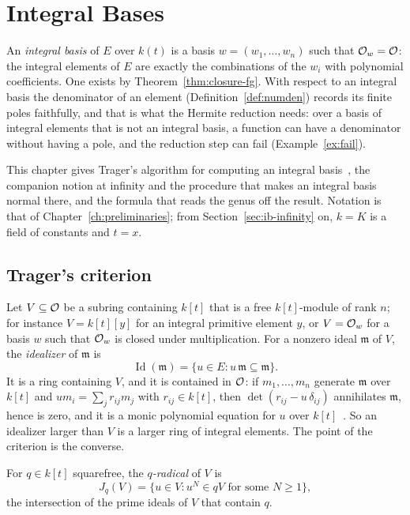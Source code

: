 \chapter{Integral Bases}\label{ch:integral-bases}

An \emph{integral basis} of $E$ over $k(t)$ is a basis $w = (w_1, \dots,
w_n)$ such that $\mathcal{O}_w = \mathcal{O}$: the integral elements of $E$ are exactly the
combinations of the $w_i$ with polynomial coefficients. One exists by
Theorem~\ref{thm:closure-fg}. With respect to an integral basis the
denominator of an element (Definition~\ref{def:numden}) records its finite
poles faithfully, and that is what the Hermite reduction needs: over a basis
of integral elements that is not an integral basis, a function can have a
denominator without having a pole, and the reduction step can fail
(Example~\ref{ex:fail}).

This chapter gives Trager's algorithm for computing an integral
basis~\cite[Chapter~2]{trager1984}, the companion notion at infinity and the
procedure that makes an integral basis normal there, and the formula that
reads the genus off the result. Notation is that of
Chapter~\ref{ch:preliminaries}; from Section~\ref{sec:ib-infinity} on, $k = K$
is a field of constants and $t = x$.

\section{Trager's criterion}\label{sec:ib-criterion}

Let $V \subseteq \mathcal{O}$ be a subring containing $k[t]$ that is a free
$k[t]$-module of rank $n$; for instance $V = k[t][y]$ for an integral
primitive element $y$, or $V = \mathcal{O}_w$ for a basis $w$ such that $\mathcal{O}_w$ is
closed under multiplication. For a nonzero ideal $\mathfrak m$ of $V$, the
\emph{idealizer} of $\mathfrak m$ is
\[
  \operatorname{Id}(\mathfrak m) = \{ u \in E : u\, \mathfrak m \subseteq \mathfrak m \} .
\]
It is a ring containing $V$, and it is contained in $\mathcal{O}$: if $m_1, \dots,
m_n$ generate $\mathfrak m$ over $k[t]$ and $u m_i = \sum_j r_{ij} m_j$ with
$r_{ij} \in k[t]$, then $\det(r_{ij} - u\, \delta_{ij})$ annihilates
$\mathfrak m$, hence is zero, and it is a monic polynomial equation for $u$
over $k[t]$~\cite[Lemma~2.2]{trager1984}. So an idealizer larger than $V$ is a
larger ring of integral elements. The point of the criterion is the
converse.

For $q \in k[t]$ squarefree, the \emph{$q$-radical} of $V$ is
\[
  J_q(V) = \{ u \in V : u^N \in q V \text{ for some } N \ge 1 \} ,
\]
the intersection of the prime ideals of $V$ that contain $q$.

